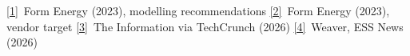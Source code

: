 \href{https://formenergy.com/}{[1]}~Form Energy (2023), modelling recommendations\quad
\href{https://formenergy.com/}{[2]}~Form Energy (2023), vendor target\quad
\href{https://techcrunch.com/2026/02/26/google-paid-startup-form-energy-1b-for-its-massive-100-hour-battery/}{[3]}~The Information via TechCrunch (2026)\quad
\href{https://www.ess-news.com/2026/04/28/us-medium-duration-storage-endures-woes-while-forms-long-duration-grows-and-lithium-overflows/}{[4]}~Weaver, ESS News (2026)
